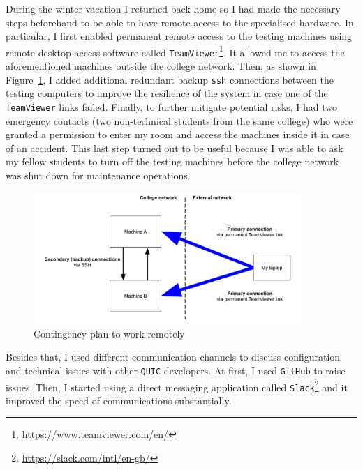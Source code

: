 \documentclass[12pt,a4paper,twoside,openright]{report}
\begin{document}
    During the winter vacation I returned back home so I had made the necessary steps beforehand to be able to have remote access to the specialised hardware.
    In particular, I first enabled permanent remote access to the testing machines using remote desktop access software called \texttt{TeamViewer}\footnote{\url{https://www.teamviewer.com/en/}}.
    It allowed me to access the aforementioned machines outside the college network.
    Then, as shown in Figure~\ref{fig:setup_map}, I added additional redundant backup \texttt{ssh} connections between the testing computers to improve the resilience of the system in case one of the \texttt{TeamViewer} links failed.
    Finally, to further mitigate potential risks, I had two emergency contacts (two non-technical students from the same college) who were granted a permission to enter my room and access the machines inside it in case of an accident.
    This last step turned out to be useful because I was able to ask my fellow students to turn off the testing machines before the college network was shut down for maintenance operations.
    

    \begin{figure}[ht]
    \centering
    \includegraphics[width=0.9\textwidth]{figs/Setup map.png}
    \caption[Contingency plan to work remotely]{Contingency plan to work remotely}
    \label{fig:setup_map}
    \end{figure}

    Besides that, I used different communication channels to discuss configuration and technical issues with other \texttt{QUIC} developers.
    At first, I used \texttt{GitHub} to raise issues.
    Then, I started using a direct messaging application called \texttt{Slack}\footnote{\url{https://slack.com/intl/en-gb/}} 
    and it improved the speed of communications substantially.
\end{document}
